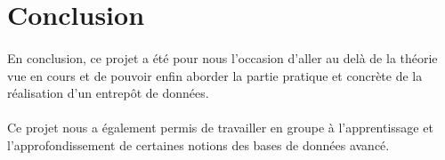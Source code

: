 \section{Conclusion}

\paragraph{} En conclusion, ce projet a été pour nous l'occasion d'aller au delà de la théorie vue en cours et de pouvoir enfin aborder la partie pratique et concrète de la réalisation d'un entrepôt de données.

\paragraph{} Ce projet nous a également permis de travailler en groupe à l'apprentissage et l'approfondissement de certaines notions des bases de données avancé.

